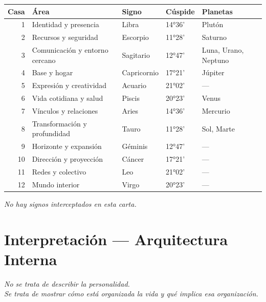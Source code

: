 \documentclass[11pt,a4paper]{article}
\begin{document}
\begin{center}
\begin{tabular}{rllll}
  \toprule
  \textbf{Casa} & \textbf{Área} & \textbf{Signo} & \textbf{Cúspide} & \textbf{Planetas} \\
  \midrule
  1 & Identidad y presencia & Libra & 14°36' & Plutón \\
  2 & Recursos y seguridad & Escorpio & 11°28' & Saturno \\
  3 & Comunicación y entorno cercano & Sagitario & 12°47' & Luna, Urano, Neptuno \\
  4 & Base y hogar & Capricornio & 17°21' & Júpiter \\
  5 & Expresión y creatividad & Acuario & 21°02' & — \\
  6 & Vida cotidiana y salud & Piscis & 20°23' & Venus \\
  7 & Vínculos y relaciones & Aries & 14°36' & Mercurio \\
  8 & Transformación y profundidad & Tauro & 11°28' & Sol, Marte \\
  9 & Horizonte y expansión & Géminis & 12°47' & — \\
  10 & Dirección y proyección & Cáncer & 17°21' & — \\
  11 & Redes y colectivo & Leo & 21°02' & — \\
  12 & Mundo interior & Virgo & 20°23' & — \\
  \bottomrule
\end{tabular}
\end{center}

\vspace{0.3cm}\textit{No hay signos interceptados en esta carta.}

\newpage

\section{Interpretación — Arquitectura Interna}

\begin{center}
{\small\itshape
No se trata de describir la personalidad.\\ Se trata de mostrar cómo está organizada la vida y qué implica esa organización.
}
\end{center}

\vspace{0.5cm}

\end{document}
